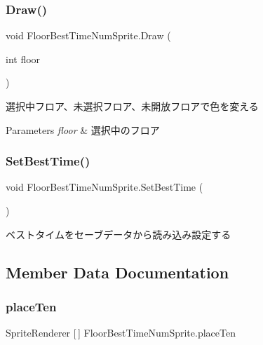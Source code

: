 \subsubsection{\texorpdfstring{Draw()}{Draw()}}
{\footnotesize\ttfamily void Floor\+Best\+Time\+Num\+Sprite.\+Draw (\begin{DoxyParamCaption}\item[{int}]{floor }\end{DoxyParamCaption})\hspace{0.3cm}{\ttfamily [inline]}}



選択中フロア、未選択フロア、未開放フロアで色を変える 


\begin{DoxyParams}{Parameters}
{\em floor} & 選択中のフロア\\
\hline
\end{DoxyParams}
\mbox{\label{class_floor_best_time_num_sprite_a814f407e953d90bd1a5bdcd6af600536}} 
\subsubsection{\texorpdfstring{Set\+Best\+Time()}{SetBestTime()}}
{\footnotesize\ttfamily void Floor\+Best\+Time\+Num\+Sprite.\+Set\+Best\+Time (\begin{DoxyParamCaption}{ }\end{DoxyParamCaption})\hspace{0.3cm}{\ttfamily [inline]}}



ベストタイムをセーブデータから読み込み設定する 



\subsection{Member Data Documentation}
\mbox{\label{class_floor_best_time_num_sprite_ac71de1c29afcebc316d09e1755fb2114}} 
\subsubsection{\texorpdfstring{place\+Ten}{placeTen}}
{\footnotesize\ttfamily Sprite\+Renderer \mbox{[}$\,$\mbox{]} Floor\+Best\+Time\+Num\+Sprite.\+place\+Ten\hspace{0.3cm}{\ttfamily [private]}}




